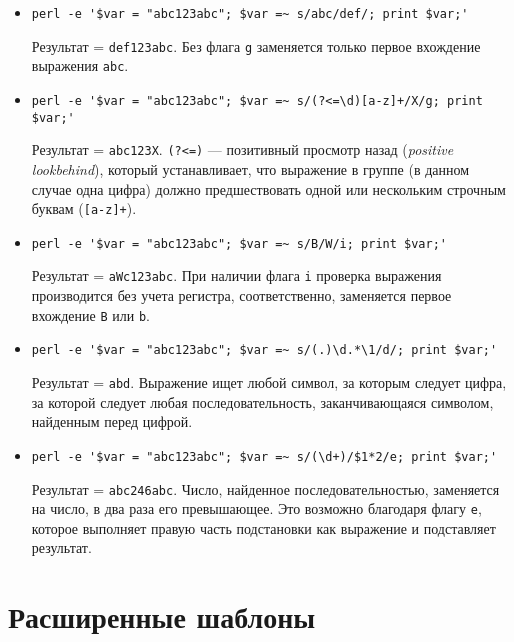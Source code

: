\documentclass[listings]{labreport}
\begin{document}
\begin{itemize}
\item \verb|perl -e '$var = "abc123abc"; $var =~ s/abc/def/; print $var;'|

Результат = \texttt{def123abc}. Без флага \verb|g| заменяется только первое
вхождение выражения \verb|abc|.

\item \verb|perl -e '$var = "abc123abc"; $var =~ s/(?<=\d)[a-z]+/X/g; print $var;'|

Результат = \texttt{abc123X}. \verb|(?<=)| — позитивный просмотр назад (\textit{positive lookbehind}),
который устанавливает, что выражение в группе (в данном случае одна цифра) должно предшествовать
одной или нескольким строчным буквам (\verb|[a-z]+|).

\item \verb|perl -e '$var = "abc123abc"; $var =~ s/B/W/i; print $var;'|

Результат = \texttt{aWc123abc}. При наличии флага \verb|i| проверка выражения производится
без учета регистра, соответственно, заменяется первое вхождение \texttt{B} или \texttt{b}.

\item \verb|perl -e '$var = "abc123abc"; $var =~ s/(.)\d.*\1/d/; print $var;'|

Результат = \texttt{abd}. Выражение ищет любой символ, за которым следует цифра, за которой
следует любая последовательность, заканчивающаяся символом, найденным перед цифрой. 

\item \verb|perl -e '$var = "abc123abc"; $var =~ s/(\d+)/$1*2/e; print $var;'|

Результат = \texttt{abc246abc}. Число, найденное последовательностью, заменяется
на число, в два раза его превышающее. Это возможно благодаря флагу \verb|e|,
которое выполняет правую часть подстановки как выражение и подставляет результат.

\end{itemize}

\section*{Расширенные шаблоны}
\end{document}
